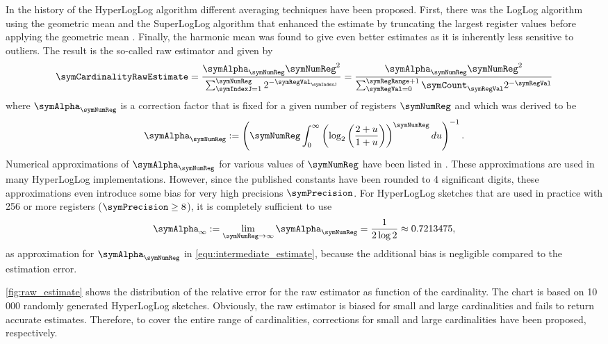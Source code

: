 \documentclass[a4paper]{scrartcl}
\begin{document}
In the history of the HyperLogLog algorithm different averaging techniques have been proposed. First, there was the LogLog algorithm using the geometric mean and the SuperLogLog algorithm that enhanced the estimate by truncating the largest register values before applying the geometric mean \cite{Durand2003}. Finally, the harmonic mean was found to give even better estimates as it is inherently less sensitive to outliers. The result is the so-called raw estimator and given by
\begin{equation}
\label{equ:intermediate_estimate}
\symCardinalityRawEstimate
= 
\frac{\symAlpha_\symNumReg \symNumReg^2}{\sum_{\symIndexJ=1}^{\symNumReg}2^{-\symRegVal_\symIndexJ}}
= 
\frac{\symAlpha_\symNumReg \symNumReg^2}{\sum_{\symRegVal=0}^{\symRegRange+1}\symCount_\symRegVal 2^{-\symRegVal}}
\end{equation}
where $\symAlpha_\symNumReg$  is a correction factor that is fixed for a given number of registers $\symNumReg$ and which was derived to be \cite{Flajolet2007}
\begin{equation}
\symAlpha_\symNumReg := \left(
\symNumReg
\int_0^\infty
\left(
\log_2\left(
\frac{2+u}{1+u}
\right)
\right)^\symNumReg
du
\right)^{-1}.
\end{equation}
Numerical approximations of $\symAlpha_\symNumReg$ for various values of $\symNumReg$ have been listed in \cite{Flajolet2007}. These approximations are used in many HyperLogLog implementations. However, since the published constants have been rounded to 4 significant digits, these approximations even introduce some bias for very high precisions $\symPrecision$. For HyperLogLog sketches that are used in practice with 256 or more registers ($\symPrecision\geq 8$), it is completely sufficient to use 
\begin{equation}
\label{equ:alpha_inf}
\symAlpha_\infty := \lim_{\symNumReg\rightarrow\infty} \symAlpha_\symNumReg = \frac{1}{2\log 2} \approx 0.7213475,
\end{equation}
as approximation for $\symAlpha_\symNumReg$ in \eqref{equ:intermediate_estimate}, because the additional bias is negligible compared to the estimation error.

\cref{fig:raw_estimate} shows the distribution of the relative error for the raw estimator as function of the cardinality. The chart is based on 10\,000 randomly generated HyperLogLog sketches. Obviously, the raw estimator is biased for small and large cardinalities and fails to return accurate estimates. Therefore, to cover the entire range of cardinalities, corrections for small and large cardinalities have been proposed, respectively.
\end{document}
